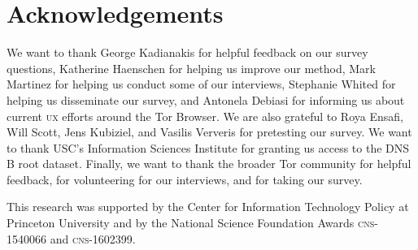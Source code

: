\section*{Acknowledgements}

We want to thank George Kadianakis for helpful feedback on our survey questions,
Katherine Haenschen for helping us improve our method, Mark Martinez for helping
us conduct some of our interviews, Stephanie Whited for helping us disseminate
our survey, and Antonela Debiasi for informing us about current \textsc{ux}
efforts around the Tor Browser.  We are also grateful to Roya Ensafi, Will
Scott, Jens Kubiziel, and Vasilis Ververis for pretesting our survey.  We want
to thank USC's Information Sciences Institute for granting us access to the DNS
B root dataset.  Finally, we want to thank the broader Tor community for helpful
feedback, for volunteering for our interviews, and for taking our survey.

This research was supported by the Center for Information Technology Policy at
Princeton University and by the National Science Foundation Awards
\textsc{cns}-1540066 and \textsc{cns}-1602399.
